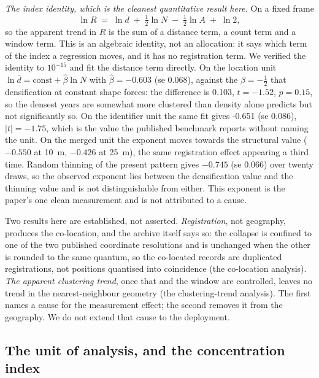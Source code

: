 \documentclass[fleqn,10pt,lineno]{wlpeerj}
\newcommand{\cleanSlope}{-0.651}
\newcommand{\cleanT}{-1.75}
\newcommand{\cleanSlopeLoc}{-0.603}
\newcommand{\cleanSELoc}{0.068}
\newcommand{\cleanTLoc}{-1.52}
\newcommand{\cleanPLoc}{0.15}
\newcommand{\cleanSlopeSite}{-0.550}
\newcommand{\cleanSlopeSiteTwo}{-0.426}
\newcommand{\thinningBeta}{-0.745}
\begin{document}
\noindent\emph{The index identity, which is the cleanest quantitative result here.} On a fixed
frame
\begin{equation}
\ln R \;=\; \ln \bar{d} \;+\; \tfrac{1}{2}\ln N \;-\; \tfrac{1}{2}\ln A \;+\; \ln 2,
\label{eq:decomp}
\end{equation}
so the apparent trend in $R$ is the sum of a distance term, a count term and a window term. This
is an algebraic identity, not an allocation: it says which term of the index a regression moves,
and it has no registration term. We
verified the identity to $10^{-15}$ and fit the distance term directly. On the location unit
$\ln\bar{d} = \mathrm{const} + \hat\beta\ln N$ with $\hat\beta = \cleanSlopeLoc$
(se \cleanSELoc), against the $\beta = -\tfrac12$ that densification at constant shape forces:
the difference is \num{0.103}, $t = \cleanTLoc$, $p = \cleanPLoc$, so the densest years are
somewhat more clustered than density alone predicts but not significantly so. On the identifier
unit the same fit gives \cleanSlope{} (se $0.086$), $|t| = \cleanT$, which is the value the
published benchmark reports without naming the unit. On the merged unit the exponent
moves towards the structural value ($\cleanSlopeSite$ at \SI{10}{\meter},
$\cleanSlopeSiteTwo$ at \SI{25}{\meter}), the same registration effect appearing a third time.
Random thinning of the present pattern gives $\thinningBeta$ (se \num{0.066}) over twenty draws,
so the observed exponent lies between the densification value and the thinning value and is not
distinguishable from either. This exponent is the paper's one clean measurement and is not
attributed to a cause.

Two results here are established, not asserted. \emph{Registration}, not geography, produces
the co-location, and the archive itself says so: the collapse is confined to one of the two
published coordinate resolutions and is unchanged when the other is rounded to the same quantum,
so the co-located records are duplicated registrations, not positions quantised into
coincidence (the co-location analysis). \emph{The apparent clustering trend}, once that
and the window are controlled, leaves no trend in the nearest-neighbour geometry
(the clustering-trend analysis). The first names a cause for the measurement effect; the second
removes it from the geography. We do not extend that cause to the deployment.

\subsection*{The unit of analysis, and the concentration index}
\label{sec:results-unit}
\end{document}
